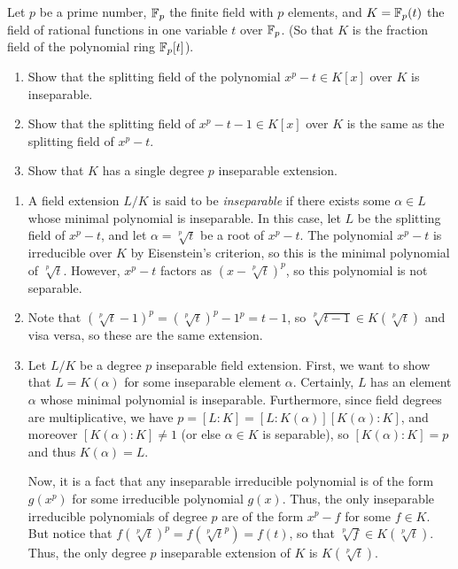 %
\begin{question}[subtitle = August 2022 Problem 4,ID=Aug22_4]
Let $p$ be a prime number, $\mathbb{F}_p$ the finite field with $p$ elements, and $K = \mathbb{F}_p(t)$ the field of rational functions in one variable $t$ over $\mathbb{F}_p$. (So that $K$ is the fraction field of the polynomial ring $\mathbb{F}_p[t]$).
\begin{enumerate}
    \item Show that the splitting field of the polynomial $x^p-t \in K[x]$ over $K$ is inseparable.
    \item Show that the splitting field of $x^p - t - 1 \in K[x]$ over $K$ is the same as the splitting field of $x^p-t$.
    \item Show that $K$ has a single degree $p$ inseparable extension.
\end{enumerate}
\end{question}
\begin{solution}
\begin{enumerate}
    \item A field extension $L/K$ is said to be \emph{inseparable} if there exists some $\alpha \in L$ whose minimal polynomial is inseparable. In this case, let $L$ be the splitting field of $x^p-t$, and let $\alpha=\sqrt[p]{t}$ be a root of $x^p-t$. The polynomial $x^p-t$ is irreducible over $K$ by Eisenstein's criterion, so this is the minimal polynomial of $\sqrt[p]{t}$. However, $x^p-t$ factors as $(x-\sqrt[p]{t})^p$, so this polynomial is not separable.
    \item Note that $(\sqrt[p]{t}-1)^p = (\sqrt[p]{t})^p - 1^p = t-1$, so $\sqrt[p]{t-1} \in K(\sqrt[p]{t})$ and visa versa, so these are the same extension.
    \item Let $L/K$ be a degree $p$ inseparable field extension. First, we want to show that $L = K(\alpha)$ for some inseparable element $\alpha$. Certainly, $L$ has an element $\alpha$ whose minimal polynomial is inseparable. Furthermore, since field degrees are multiplicative, we have $p = [L:K] = [L:K(\alpha)][K(\alpha):K]$, and moreover $[K(\alpha):K] \neq 1$ (or else $\alpha \in K$ is separable), so $[K(\alpha):K] = p$ and thus $K(\alpha) = L$.
    
    Now, it is a fact that any inseparable irreducible polynomial is of the form $g(x^p)$ for some irreducible polynomial $g(x)$. Thus, the only inseparable irreducible polynomials of degree $p$ are of the form $x^p - f$ for some $f \in K$. But notice that $f(\sqrt[p]{t})^p = f(\sqrt[p]{t}^p) = f(t)$, so that $\sqrt[p]{f} \in K(\sqrt[p]{t})$. Thus, the only degree $p$ inseparable extension of $K$ is $K(\sqrt[p]{t})$.
\end{enumerate}
\end{solution}

